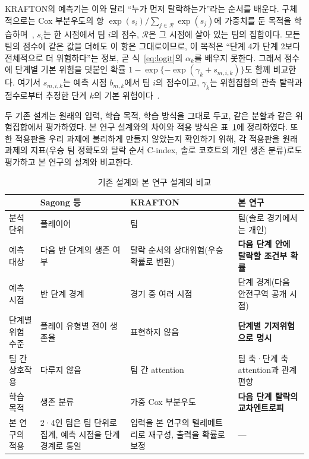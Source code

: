 KRAFTON의 예측기는 이와 달리 “누가 먼저 탈락하는가”라는 순서를 배운다.
구체적으로는 Cox 부분우도의 항 $\exp(s_i)/\sum_{j\in\mathcal{R}}\exp(s_j)$에 가중치를 둔 목적을 학습하며~\cite{Cox72}, $s_i$는 한 시점에서 팀 $i$의 점수, $\mathcal{R}$은 그 시점에 살아 있는 팀의 집합이다.
모든 팀의 점수에 같은 값을 더해도 이 항은 그대로이므로, 이 목적은 “단계 4가 단계 2보다 전체적으로 더 위험하다”는 정보, 곧 식~\eqref{eq:logit}의 $\alpha_k$를 배우지 못한다.
그래서 점수에 단계별 기본 위험을 덧붙인 확률 $1-\exp\{-\exp(\gamma_k+s_{m,i,k})\}$도 함께 비교한다. 여기서 $s_{m,i,k}$는 예측 시점 $b_{m,k}$에서 팀 $i$의 점수이고, $\gamma_k$는 위험집합의 관측 탈락과 점수로부터 추정한 단계 $k$의 기본 위험이다~\cite{PrenticeGloeckler78}.

두 기존 설계는 원래의 입력, 학습 목적, 학습 방식을 그대로 두고, 같은 분할과 같은 위험집합에서 평가하였다. 본 연구 설계와의 차이와 적용 방식은 표~\ref{tab:compare}에 정리하였다.
또한 적용판을 우리 과제에 불리하게 만들지 않았는지 확인하기 위해, 각 적용판을 원래 과제의 지표(우승 팀 정확도와 탈락 순서 C-index, 솔로 코호트의 개인 생존 분류)로도 평가하고 본 연구의 설계와 비교한다.

\begin{table}[t]
\centering
\caption{기존 설계와 본 연구 설계의 비교}
\label{tab:compare}
\footnotesize
\renewcommand{\arraystretch}{1.2}
\begin{tabular}{p{2.3cm}p{4.3cm}p{4.6cm}p{4.6cm}}
\hline
 & Sagong 등~\cite{Sagong25a} & KRAFTON~\cite{KRAFTON} & 본 연구 \\
\hline
분석 단위 & 플레이어 & 팀 & 팀(솔로 경기에서는 개인) \\
예측 대상 & 다음 반 단계의 생존 여부 & 탈락 순서의 상대위험(우승확률로 변환) & \textbf{다음 단계 안에 탈락할 조건부 확률} \\
예측 시점 & 반 단계 경계 & 경기 중 여러 시점 & 단계 경계(다음 안전구역 공개 시점) \\
단계별 위험 수준 & 플레이 유형별 전이 생존율 & 표현하지 않음 & \textbf{단계별 기저위험으로 명시} \\
팀 간 상호작용 & 다루지 않음 & 팀 간 attention & 팀 축·단계 축 attention과 관계 편향 \\
학습 목적 & 생존 분류 & 가중 Cox 부분우도 & \textbf{다음 단계 탈락의 교차엔트로피} \\
\hline
본 연구의 적용 & 2·4인 팀은 팀 단위로 집계, 예측 시점을 단계 경계로 통일 & 입력을 본 연구의 텔레메트리로 재구성, 출력을 확률로 보정 & --- \\
\hline
\end{tabular}
\end{table}

